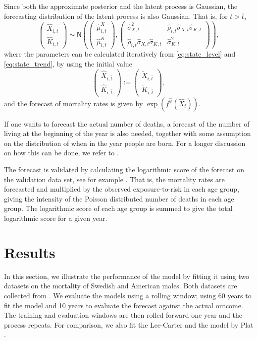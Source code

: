 \documentclass[preprint,12pt]{elsarticle}
\newcommand{\m}[1]{\begin{pmatrix}
#1
\end{pmatrix}}
\newcommand{\pa}[1]{\left(#1\right)}
\begin{document}
Since both the approximate posterior and the latent process is Gaussian, the forecasting distribution of the latent process is also Gaussian. That is, for $t>\bar t$,
\begin{equation}
\m{
\hat X_{i,t}\\ \hat K_{i,t}} 
\sim \mathsf N\pa{
\m{\hat\mu^X_{i,t}\\
\hat\mu^K_{i,t}}
,
\m{
\hat \sigma^2_{X,t} & \hat\rho_{i,t}\hat \sigma_{X,t}\hat \sigma_{K,t}\\
 \hat\rho_{i,t}\hat \sigma_{X,t}\hat \sigma_{K,t} & \hat \sigma^2_{K,t}
}
},
\end{equation}
where the parameters can be calculated iteratively from \eqref{eq:state_level} and \eqref{eq:state_trend}, by using the initial value
\begin{equation}
	\m{
\hat X_{i,\bar t}\\ \hat K_{i,\bar t}}:=  	\m{
\tilde X_{i,\bar t}\\ \tilde K_{i,\bar t}},
\end{equation}
and  the forecast of mortality rates is given by $\exp(f^{\hat \psi}(\hat X_t))$.

If one wants to forecast the actual number of deaths, a forecast of the number of living at the beginning of the year is also needed, together with some assumption on the distribution of when in the year people are born. For a longer discussion on how this can be done, we refer to \cite{andersson2020mortality}.

The forecast is validated by calculating the logarithmic score of the forecast on the validation data set, see for example \cite{gneiting2007strictly}. That is, the mortality rates are forecasted and multiplied by the observed exposure-to-risk in each age group, giving the intensity of the Poisson distributed number of deaths in each age group. The logarithmic score of each age group is summed to give the total logarithmic score for a given year.

\section{Results}\label{sec:results}

In this section, we illustrate the performance of the model by fitting it using two datasets on the mortality of Swedish and American males. Both datasets are collected from \cite{hmd2018data}. We evaluate the models using a rolling window; using 60 years to fit the model and 10 years to evaluate the forecast against the actual outcome. The training and evaluation windows are then rolled forward one year and the process repeats. For comparison, we also fit the Lee-Carter and the model by Plat \citep{plat2009stochastic}.
\end{document}
